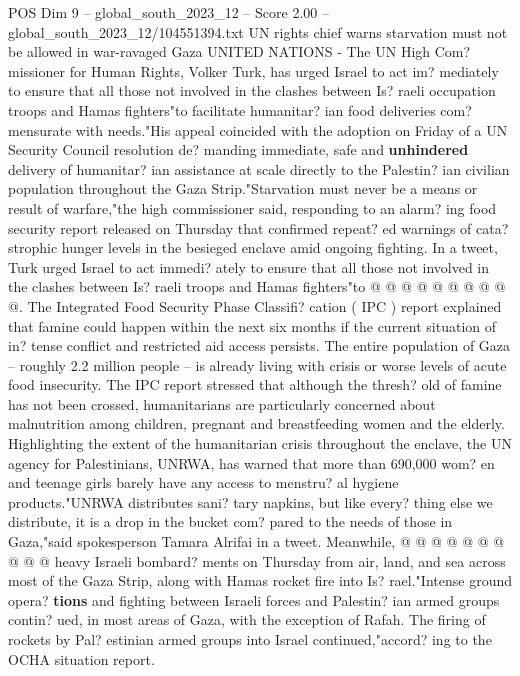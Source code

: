 \begin{textsample}{POS Dim 9 – global\_south\_2023\_12 – Score 2.00 – global\_south\_2023\_12/104551394.txt}  \label{ex:f9_pos_017}
UN rights chief warns starvation must not be allowed in war-ravaged Gaza UNITED NATIONS - The UN High Com? missioner for Human Rights, Volker Turk, has urged Israel to act im? mediately to ensure that all those not involved in the clashes between Is? raeli occupation troops and Hamas fighters"to facilitate humanitar? ian food deliveries com? mensurate with needs."His appeal coincided with the adoption on Friday of a UN Security Council resolution de? manding immediate, safe and \textbf{unhindered} delivery of humanitar? ian assistance at scale directly to the Palestin? ian civilian population throughout the Gaza Strip."Starvation must never be a means or result of warfare,"the high commissioner said, responding to an alarm? ing food security report released on Thursday that confirmed repeat? ed warnings of cata? strophic hunger levels in the besieged enclave amid ongoing fighting.
In a tweet, Turk urged Israel to act immedi? ately to ensure that all those not involved in the clashes between Is? raeli troops and Hamas fighters"to @ @ @ @ @ @ @ @ @ @.
The Integrated Food Security Phase Classifi? cation ( IPC ) report explained that famine could happen within the next six months if the current situation of in? tense conflict and restricted aid access persists.
The entire population of Gaza -- roughly 2.2 million people -- is already living with crisis or worse levels of acute food insecurity.
The IPC report stressed that although the thresh? old of famine has not been crossed, humanitarians are particularly concerned about malnutrition among children, pregnant and breastfeeding women and the elderly.
Highlighting the extent of the humanitarian crisis throughout the enclave, the UN agency for Palestinians, UNRWA, has warned that more than 690,000 wom? en and teenage girls barely have any access to menstru? al hygiene products."UNRWA distributes sani? tary napkins, but like every? thing else we distribute, it is a drop in the bucket com? pared to the needs of those in Gaza,"said spokesperson Tamara Alrifai in a tweet.
Meanwhile, @ @ @ @ @ @ @ @ @ @ heavy Israeli bombard? ments on Thursday from air, land, and sea across most of the Gaza Strip, along with Hamas rocket fire into Is? rael."Intense ground opera? \textbf{tions} and fighting between Israeli forces and Palestin? ian armed groups contin? ued, in most areas of Gaza, with the exception of Rafah.
The firing of rockets by Pal? estinian armed groups into Israel continued,"accord? ing to the OCHA situation report.

\end{textsample}

